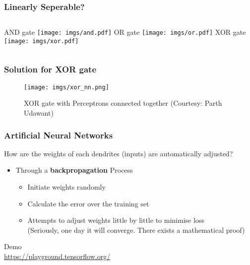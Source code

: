 \documentclass[aspectratio=169]{beamer}
\begin{document}
\begin{frame}
	\frametitle{Linearly Seperable?}
	\begin{columns}[t]
		{\large AND gate}
		\onslide<2->
		\texttt{[image: imgs/and.pdf]}
		{\onslide<1-> \large OR gate}
		\onslide<3->
		\texttt{[image: imgs/or.pdf]}
		{\onslide<1-> \large XOR gate}
		\onslide<4->
		\texttt{[image: imgs/xor.pdf]}
	\end{columns}
\end{frame}

\begin{frame}
	\frametitle{Solution for XOR gate}
	\begin{center}
		\begin{figure}
			\texttt{[image: imgs/xor\_nn.png]}
			\caption{XOR gate with Perceptrons connected together (Courtesy: Parth Udawant)}
		\end{figure}
	\end{center}
\end{frame}

\begin{frame}
	\frametitle{Artificial Neural Networks}
	How are the weights of each dendrites (inputs) are automatically adjusted?
	\begin{itemize}
		\item<2-> Through a \textbf{backpropagation} Process
		\begin{itemize}
			\item<3-> Initiate weights randomly
			\item<4-> Calculate the error over the training set
			\item<5-> Attempts to adjust weights little by little to minimise loss\\
			{\onslide<6-> \tiny (Seriously, one day it will converge. There exists a mathematical proof)}
		\end{itemize}
	\end{itemize}
\end{frame}

\begin{frame}
	\begin{center}
		{\Huge Demo}\\
		\url{https://playground.tensorflow.org/}
	\end{center}
\end{frame}
\end{document}
